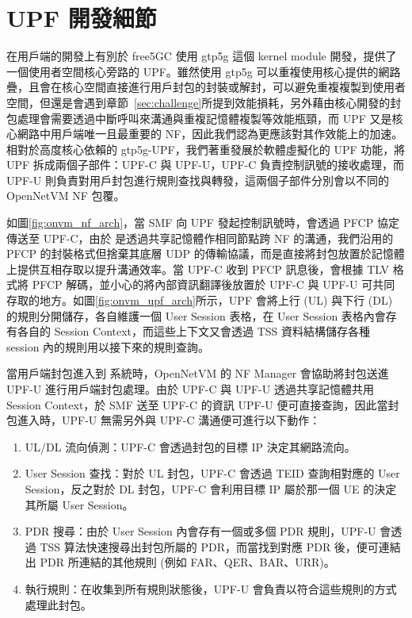 \section{UPF 開發細節}
\label{sec:upf_porting}

在用戶端的開發上有別於 free5GC 使用 gtp5g 這個 kernel module 開發，\LHCN 提供了一個使用者空間核心旁路的 UPF。雖然使用 gtp5g 可以重複使用核心提供的網路疊，且會在核心空間直接進行用戶封包的封裝或解封，可以避免重複複製到使用者空間，但還是會遇到章節~\ref{sec:challenge}所提到效能損耗，另外藉由核心開發的封包處理會需要透過中斷呼叫來溝通\cite{interrupt_process}與重複記憶體複製等效能瓶頸，而 UPF 又是核心網路中用戶端唯一且最重要的 NF，因此我們認為更應該對其作效能上的加速。相對於高度核心依賴的 gtp5g-UPF，我們著重發展於軟體虛擬化的 UPF 功能，將 UPF 拆成兩個子部件：UPF-C 與 UPF-U，UPF-C 負責控制訊號的接收處理，而 UPF-U 則負責對用戶封包進行規則查找與轉發，這兩個子部件分別會以不同的 OpenNetVM NF 包覆。

如圖\ref{fig:onvm_nf_arch}，當 SMF 向 UPF 發起控制訊號時，會透過 PFCP 協定傳送至 UPF-C，由於 \LHCN 是透過共享記憶體作相同節點跨 NF 的溝通，我們沿用的 PFCP 的封裝格式但捨棄其底層 UDP 的傳輸協議，而是直接將封包放置於記憶體上提供互相存取以提升溝通效率。當 UPF-C 收到 PFCP 訊息後，會根據 TLV 格式將 PFCP 解碼，並小心的將內部資訊翻譯後放置於 UPF-C 與 UPF-U 可共同存取的地方。如圖\ref{fig:onvm_upf_arch}所示，UPF 會將上行 (UL) 與下行 (DL) 的規則分開儲存，各自維護一個 User Session 表格，在 User Session 表格內會存有各自的 Session Context，而這些上下文又會透過 TSS 資料結構儲存各種 session 內的規則用以接下來的規則查詢。


當用戶端封包進入到 \LHCN 系統時，OpenNetVM 的 NF Manager 會協助將封包送進 UPF-U 進行用戶端封包處理。由於 UPF-C 與 UPF-U 透過共享記憶體共用 Session Context，於 SMF 送至 UPF-C 的資訊 UPF-U 便可直接查詢，因此當封包進入時，UPF-U 無需另外與 UPF-C 溝通便可進行以下動作：

\begin{enumerate}
\item UL/DL 流向偵測：UPF-C 會透過封包的目標 IP 決定其網路流向。
\item User Session 查找：對於 UL 封包，UPF-C 會透過 TEID 查詢相對應的 User Session，反之對於 DL 封包，UPF-C 會利用目標 IP 屬於那一個 UE 的決定其所屬 User Session。
\item PDR 搜尋：由於 User Session 內會存有一個或多個 PDR 規則，UPF-U 會透過 TSS 算法快速搜尋出封包所屬的 PDR，而當找到對應 PDR 後，便可連結出 PDR 所連結的其他規則 (例如 FAR、QER、BAR、URR)。
\item 執行規則：在收集到所有規則狀態後，UPF-U 會負責以符合這些規則的方式處理此封包。
\end{enumerate}

